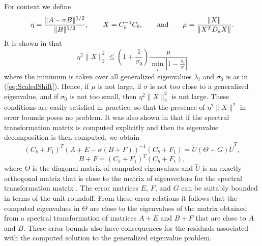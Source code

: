 For context we define
\begin{equation*}
  \eta = \frac{\|A-\sigma B\|^{1/2}}{\|B\|^{1/2}},\qquad
  X = C_a^{-1} C_b,\eqand \mu = \frac{\|X\|}{\|X^T D_a X\|}.
\end{equation*}
It is shown in \cite{stewart2024spectraltransformationdensesymmetric} that
\begin{equation*}
  \eta^2 \|X\|_2^2 \leq \left( 1 + \frac{1}{\sigma_0} \right)
  \frac{\mu}{\min_i \left| 1 - \frac{\lambda_i}{\sigma}\right|}
\end{equation*}
where the minimum is taken over all generalized eigenvalues $\lambda_i$ and $\sigma_0$ is as in (\ref{eq:ScaledShift}).  Hence, if $\mu$ is not large, if $\sigma$ is not too close to a generalized eigenvalue, and if $\sigma_0$ is not too small, then $\eta^2 \|X\|_2^2$ is not large.  These conditions are easily satisfied in practice, so that the presence of $\eta^2 \|X\|^2$ in error bounds poses no problem.  It was also shown in \cite{stewart2024spectraltransformationdensesymmetric} that if the spectral transformation matrix is computed explicitly and then its eigenvalue decomposition is then computed, we obtain
\begin{equation}
  \label{eq:mixed_errors}
  (C_b + F_1)^T (A+E - \sigma (B+F))^{-1} (C_b + F_1) 
  = \tilde{U} (\Theta + G) \tilde{U}^T,
\end{equation}
\begin{equation}
  \label{eq:B_errors}
  B+F = (C_b + F_1)^T (C_b +F_1),
\end{equation}
where $\Theta$ is the diagonal matrix of computed eigenvalues and $\tilde{U}$ is an exactly orthogonal matrix that is close to the matrix of  eigenvectors for the spectral transformation matrix .  The error matrices $E$, $F$, and $G$ can be suitably bounded in terms of the unit roundoff.  From these error relations it follows that the computed eigenvalues in $\Theta$ are close to the eigenvalues of the matrix obtained from a spectral transformation of matrices $A+E$ and $B+F$ that are close to $A$ and $B$.  These error bounds also have consequences for the residuals associated with the computed solution to the generalized eigenvalue problem.

